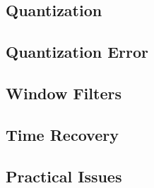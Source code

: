 \begin{refsection}
\subsection{Quantization}

\subsection{Quantization Error}

\subsection{Window Filters}

\subsection{Time Recovery}

\subsection{Practical Issues}

{}
\printbibliography[heading=subbibliography]
\end{refsection}

